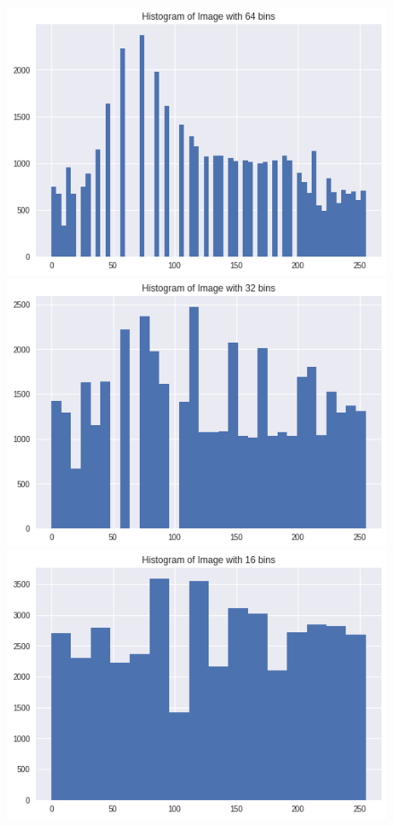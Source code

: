 \documentclass{article}
\begin{document}
\begin{enumerate}[label=B\arabic*)]
\begin{figure}[h!]
			\hfill
			\begin{minipage}{0.24\textwidth}
				\centering
				\includegraphics[width=0.9\linewidth]{Hist/Equalized/Histogram(bin-64).png}
			\end{minipage}
			\hfill
			\begin{minipage}{0.24\textwidth}
				\centering
				\includegraphics[width=0.9\linewidth]{Hist/Equalized/Histogram(bin-32).png}
			\end{minipage}
			\hfill
			\begin{minipage}{0.24\textwidth}
				\centering
				\includegraphics[width=0.9\linewidth]{Hist/Equalized/Histogram(bin-16).png}

\end{minipage}
\end{figure}
\end{enumerate}
\end{document}
